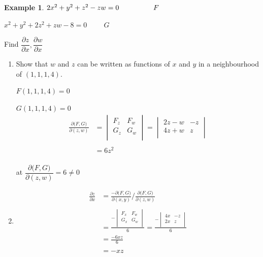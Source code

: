 \documentclass[11pt,a4paper]{article}
\theoremstyle{definition}
\newtheorem{exa}[thm]{Example}
\begin{document}
\begin{exa}


$2x^2 + y^2 + z^2 -zw = 0 \hspace{1.7cm} F$


$x^2 + y^2 +2z^2 + zw- 8 = 0 \hspace{1cm} G$


Find $\dfrac{\partial z}{\partial x}, \dfrac{\partial w}{\partial x}$


\begin{enumerate}
\item Show that $w$ and $z$ can be written as functions of $x$ and $y$ in a neighbourhood of $(1,1,1,4)$.

$F(1,1,1,4) = 0$

$G(1,1,1,4) = 0$
\begin{align*}
\frac{\partial \big(F,G\big)}{\partial (z,w)} & = \begin{vmatrix}
F_z & F_w\\
G_z & G_w\\
\end{vmatrix}=\begin{vmatrix}
2z - w & -z\\
4z + w & z\\
\end{vmatrix}\\\\
& = 6z^2\\
\end{align*}

at $\dfrac{\partial \big(F,G\big)}{\partial (z,w)} = 6 \neq 0$

\item 
\begin{align*}
\frac{\partial z}{\partial x} & = \frac{- \partial \big(F,G\big)}{\partial (x,y)}\Bigg/ \frac{\partial \big(F,G\big)}{\partial (z,w)}\\\\
& = \frac{-\begin{vmatrix}
F_x & F_w\\
G_x & G_w\\
\end{vmatrix}
}{6} = \frac{-
\begin{vmatrix}
4x & -z\\
2x & z\\
\end{vmatrix}
}{6}\\
& = \frac{-6xz}{6}\\\\
& = -xz
\end{align*}


\end{enumerate}
\end{exa}
\end{document}

